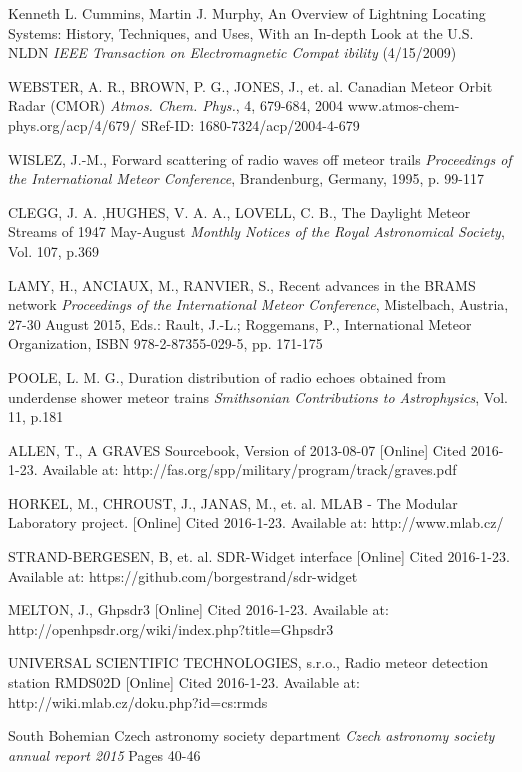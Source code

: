 \documentclass[twoside]{ctuthesis}
\theoremstyle{plain}
\theoremstyle{definition}
\theoremstyle{note}
\begin{document}
\begin{thebibliography}{99}
Kenneth L. Cummins, Martin J. Murphy,
An Overview of Lightning Locating Systems: History, Techniques, and Uses, With an In-depth Look at 
the U.S. NLDN \emph{IEEE Transaction on Electromagnetic Compat
ibility} (4/15/2009)


WEBSTER, A. R., BROWN, P. G., JONES, J., et. al.
Canadian Meteor Orbit Radar (CMOR)
\emph{Atmos. Chem. Phys.}, 4, 679-684, 2004
www.atmos-chem-phys.org/acp/4/679/
SRef-ID: 1680-7324/acp/2004-4-679

WISLEZ, J.-M.,
Forward scattering of radio waves off meteor trails
\emph{Proceedings of the International Meteor Conference}, Brandenburg, Germany, 1995, p. 99-117

CLEGG, J. A. ,HUGHES,  V. A. A., LOVELL, C. B., 
The Daylight Meteor Streams of 1947 May-August
\emph{Monthly Notices of the Royal Astronomical Society}, Vol. 107, p.369

LAMY, H., ANCIAUX, M., RANVIER, S.,
Recent advances in the BRAMS network
\emph{Proceedings of the International Meteor Conference}, Mistelbach, Austria, 27-30 August 2015, Eds.: Rault, J.-L.; Roggemans, P., International Meteor Organization, ISBN 978-2-87355-029-5, pp. 171-175

POOLE, L. M. G.,
Duration distribution of radio echoes obtained from underdense shower meteor trains
\emph{Smithsonian Contributions to Astrophysics}, Vol. 11, p.181

ALLEN, T.,
A GRAVES Sourcebook, Version of 2013-08-07
[Online] Cited 2016-1-23. Available at: http://fas.org/spp/military/program/track/graves.pdf

HORKEL, M., CHROUST, J., JANAS, M., et. al. 
MLAB - The Modular Laboratory project.
[Online] Cited 2016-1-23. Available at: http://www.mlab.cz/

STRAND-BERGESEN, B, et. al.
SDR-Widget interface
[Online] Cited 2016-1-23. Available at: https://github.com/borgestrand/sdr-widget

MELTON, J.,
Ghpsdr3
[Online] Cited 2016-1-23. Available at: http://openhpsdr.org/wiki/index.php?title=Ghpsdr3

UNIVERSAL SCIENTIFIC TECHNOLOGIES, s.r.o.,  
Radio meteor detection station RMDS02D
[Online] Cited 2016-1-23. Available at: http://wiki.mlab.cz/doku.php?id=cs:rmds

South Bohemian Czech astronomy society department
\emph{Czech astronomy society annual report 2015}
Pages 40-46


\end{thebibliography}
\end{document}
